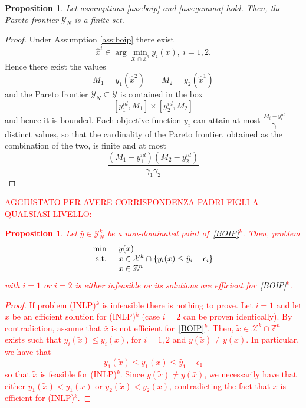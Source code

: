\documentclass[preprint,12pt]{elsarticle}
\newcommand{\red}[1]{\textcolor{red}{#1}}
\newtheorem{proposition}[theorem]{Proposition}
\def\Z{\mathbb{Z}}
\begin{document}
\begin{proposition}\label{prop:Yfinite}
Let assumptions \ref{ass:boip} and \ref{ass:gamma} hold.
Then, the Pareto frontier $\mathcal{Y}_N$ is a finite set.
\end{proposition}
\begin{proof}
Under Assumption \ref{ass:boip} there exist
$$\hat x^{i}\in \arg\min_{\mathcal{X}\cap \Z^n} y_i(x),\  i=1,2.$$
Hence there exist the values
$$M_1= y_1(\hat x^{2})\qquad M_2= y_2(\hat x^{1})$$
and
the Pareto frontier $\mathcal{Y}_N\subseteq \mathcal{Y}$ is contained in the box
$$[y_1^{id}, M_1]\times [y_2^{id}, M_2]$$
and hence it is bounded.
Each objective function $y_i$ can attain at most $\frac{M_i - y_i^{id}}{\gamma_i}$ distinct values, so that the cardinality of the Pareto frontier,
obtained as the combination of the two, is finite and at most
\[\frac{(M_1 - y_1^{id})(M_2 - y_2^{id})}{\gamma_1 \gamma_2}\]
\end{proof}
\red{AGGIUSTATO PER AVERE CORRISPONDENZA PADRI FIGLI A QUALSIASI LIVELLO:
\begin{proposition}\label{prop:nondom}
 Let $\hat y\in \mathcal{Y}_N^k$ be a non-dominated point of~\eqref{BOIP}$^k$.
 Then, problem
\begin{equation}\label{INLP}
\begin{array}{l l}
    \min & y(x)\\
    \textnormal{ s.t. }& x\in \mathcal{X}^k \cap \{ y_i(x)\leq \hat y_i - \epsilon_i\}\\
    & x\in\Z^n
  \end{array}
 \end{equation}
 with $i=1$ or $i= 2$ is either infeasible or its solutions are efficient for~\eqref{BOIP}$^k$.
 \end{proposition}
\begin{proof}
If problem (INLP)$^k$ is infeasible there is nothing to prove.
Let $i=1$ and let $\bar x$ be an efficient solution for (INLP)$^k$
(case $i=2$ can be proven identically).
By contradiction, assume that $\bar x$ is not efficient for~\eqref{BOIP}$^k$.
Then, $\tilde x\in \mathcal{X}^k \cap \Z^n$ exists
such that  $y_i(\tilde x)\leq y_i(\bar x)$, for $i=1,2$  and  $y(\tilde x)\neq y(\bar x)$.
In particular, we have that
\[y_1(\tilde x)\leq  y_1(\bar x) \leq  \hat y_1 - \epsilon_1\]
so that $\tilde x$ is feasible for (INLP)$^k$.
Since $y(\tilde x)\neq y(\bar x)$, we necessarily have that either $y_1(\tilde x)< y_1(\bar x)$ or $y_2(\tilde x)< y_2(\bar x)$,
contradicting the fact that $\bar x$ is efficient for (INLP)$^k$.
\end{proof}
}
\end{document}
